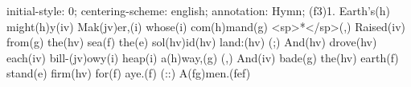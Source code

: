 initial-style: 0;
centering-scheme: english;
annotation: Hymn;
(f3)1. Earth's(h) might(h)y(iv) Mak(jv)er,(i) whose(i) com(h)mand(g) <sp>*</sp>(,)
Raised(iv) from(g) the(hv) sea(f) the(e) sol(hv)id(hv) land:(hv) (;)
And(hv) drove(hv) each(iv) bill-(jv)owy(i) heap(i) a(h)way,(g) (,)
And(iv) bade(g) the(hv) earth(f) stand(e) firm(hv) for(f) aye.(f) (::) A(fg)men.(fef)
